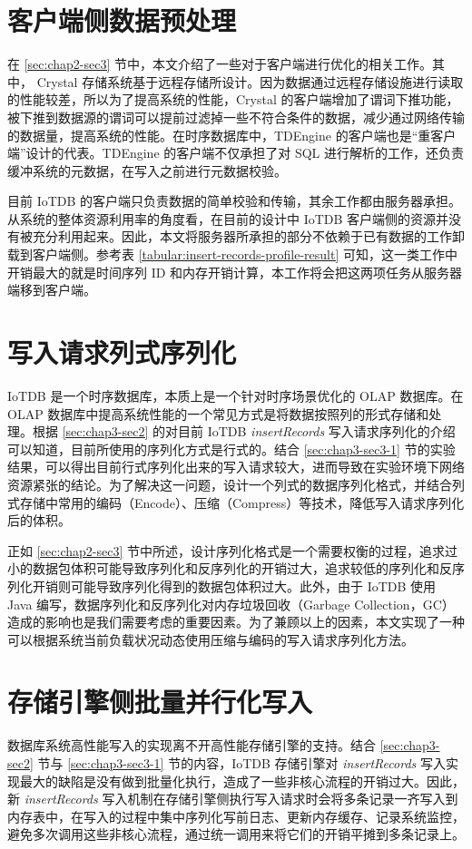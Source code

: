 \section{客户端侧数据预处理}
在 \ref{sec:chap2-sec3} 节中，本文介绍了一些对于客户端进行优化的相关工作。其中， Crystal 存储系统基于远程存储所设计\cite{durner2021crystal}。因为数据通过远程存储设施进行读取的性能较差，所以为了提高系统的性能，Crystal 的客户端增加了谓词下推功能，被下推到数据源的谓词可以提前过滤掉一些不符合条件的数据，减少通过网络传输的数据量，提高系统的性能。在时序数据库中，TDEngine 的客户端也是“重客户端”设计的代表。TDEngine 的客户端不仅承担了对 SQL 进行解析的工作，还负责缓冲系统的元数据，在写入之前进行元数据校验。

目前 IoTDB 的客户端只负责数据的简单校验和传输，其余工作都由服务器承担。从系统的整体资源利用率的角度看，在目前的设计中 IoTDB 客户端侧的资源并没有被充分利用起来。因此，本文将服务器所承担的部分不依赖于已有数据的工作卸载到客户端侧。参考表 \ref{tabular:insert-records-profile-result} 可知，这一类工作中开销最大的就是时间序列 ID 和内存开销计算，本工作将会把这两项任务从服务器端移到客户端。

\section{写入请求列式序列化}
IoTDB 是一个时序数据库，本质上是一个针对时序场景优化的 OLAP 数据库\cite{谭新宇2023一致性协议}。在 OLAP 数据库中提高系统性能的一个常见方式是将数据按照列的形式存储和处理。根据 \ref{sec:chap3-sec2} 的对目前 IoTDB \emph{insertRecords} 写入请求序列化的介绍可以知道，目前所使用的序列化方式是行式的。结合 \ref{sec:chap3-sec3-1} 节的实验结果，可以得出目前行式序列化出来的写入请求较大，进而导致在实验环境下网络资源紧张的结论。为了解决这一问题，设计一个列式的数据序列化格式，并结合列式存储中常用的编码（Encode）、压缩（Compress）等技术，降低写入请求序列化后的体积。

正如 \ref{sec:chap2-sec3} 节中所述，设计序列化格式是一个需要权衡的过程，追求过小的数据包体积可能导致序列化和反序列化的开销过大，追求较低的序列化和反序列化开销则可能导致序列化得到的数据包体积过大。此外，由于 IoTDB 使用 Java 编写，数据序列化和反序列化对内存垃圾回收（Garbage Collection，GC）造成的影响也是我们需要考虑的重要因素。为了兼顾以上的因素，本文实现了一种可以根据系统当前负载状况动态使用压缩与编码的写入请求序列化方法。

\section{存储引擎侧批量并行化写入}
数据库系统高性能写入的实现离不开高性能存储引擎的支持。结合 \ref{sec:chap3-sec2} 节与 \ref{sec:chap3-sec3-1} 节的内容，IoTDB 存储引擎对 \emph{insertRecords} 写入实现最大的缺陷是没有做到批量化执行，造成了一些非核心流程的开销过大。因此，新 \emph{insertRecords} 写入机制在存储引擎侧执行写入请求时会将多条记录一齐写入到内存表中，在写入的过程中集中序列化写前日志、更新内存缓存、记录系统监控，避免多次调用这些非核心流程，通过统一调用来将它们的开销平摊到多条记录上。

